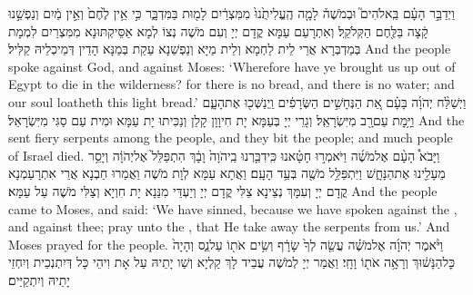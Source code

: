 {וַיְדַבֵּ֣ר הָעָ֗ם בֵּֽאלֹהִים֮ וּבְמֹשֶׁה֒ לָמָ֤ה הֶֽעֱלִיתֻ֙נוּ֙ מִמִּצְרַ֔יִם לָמ֖וּת בַּמִּדְבָּ֑ר כִּ֣י אֵ֥ין לֶ֙חֶם֙ וְאֵ֣ין מַ֔יִם וְנַפְשֵׁ֣נוּ קָ֔צָה בַּלֶּ֖חֶם הַקְּלֹקֵֽל׃}
{וְאִתְרָעַם עַמָּא קֳדָם יְיָ וְעִם מֹשֶׁה נְצוֹ לְמָא אַסֵּיקְתּוּנָא מִמִּצְרַיִם לִמְמָת בְּמַדְבְּרָא אֲרֵי לֵית לַחְמָא וְלֵית מַיָּא וְנַפְשַׁנָא עַקַת בְּמַנָּא הָדֵין דְּמֵיכְלֵיהּ קַלִּיל׃}
{And the people spoke against God, and against Moses: ‘Wherefore have ye brought us up out of Egypt to die in the wilderness? for there is no bread, and there is no water; and our soul loatheth this light bread.’}{}
{וַיְשַׁלַּ֨ח יְהֹוָ֜ה בָּעָ֗ם אֵ֚ת הַנְּחָשִׁ֣ים הַשְּׂרָפִ֔ים וַֽיְנַשְּׁכ֖וּ אֶת\maqqaf הָעָ֑ם וַיָּ֥מׇת עַם\maqqaf רָ֖ב מִיִּשְׂרָאֵֽל׃}
{וְגָרֵי יְיָ בְּעַמָּא יָת חִיוָוָן קָלַן וְנַכִּיתוּ יָת עַמָּא וּמִית עַם סַגִּי מִיִּשְׂרָאֵל׃}
{And the \lord\space sent fiery serpents among the people, and they bit the people; and much people of Israel died.}{}
{וַיָּבֹא֩ הָעָ֨ם אֶל\maqqaf מֹשֶׁ֜ה וַיֹּאמְר֣וּ חָטָ֗אנוּ כִּֽי\maqqaf דִבַּ֤רְנוּ בַֽיהֹוָה֙ וָבָ֔ךְ הִתְפַּלֵּל֙ אֶל\maqqaf יְהֹוָ֔ה וְיָסֵ֥ר מֵעָלֵ֖ינוּ אֶת\maqqaf הַנָּחָ֑שׁ וַיִּתְפַּלֵּ֥ל מֹשֶׁ֖ה בְּעַ֥ד הָעָֽם׃}
{וַאֲתָא עַמָּא לְוָת מֹשֶׁה וַאֲמַרוּ חַבְנָא אֲרֵי אִתְרָעַמְנָא קֳדָם יְיָ וְעִמָּךְ נְצֵינָא צַלִּי קֳדָם יְיָ וְיַעְדֵּי מִנַּנָא יָת חִוְיָא וְצַלִּי מֹשֶׁה עַל עַמָּא׃}
{And the people came to Moses, and said: ‘We have sinned, because we have spoken against the \lord, and against thee; pray unto the \lord, that He take away the serpents from us.’ And Moses prayed for the people.}{}
{וַיֹּ֨אמֶר יְהֹוָ֜ה אֶל\maqqaf מֹשֶׁ֗ה עֲשֵׂ֤ה לְךָ֙ שָׂרָ֔ף וְשִׂ֥ים אֹת֖וֹ עַל\maqqaf נֵ֑ס וְהָיָה֙ כׇּל\maqqaf הַנָּשׁ֔וּךְ וְרָאָ֥ה אֹת֖וֹ וָחָֽי׃}
{וַאֲמַר יְיָ לְמֹשֶׁה עֲבֵיד לָךְ קַלְיָא וְשַׁו יָתֵיהּ עַל אָת וִיהֵי כָּל דְּיִתְנְכֵית וְיִחְזֵי יָתֵיהּ וְיִתְקַיַּים׃}
